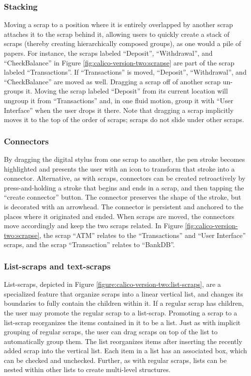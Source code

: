 \subsubsection{Stacking} Moving a scrap to a position where it is entirely overlapped by another scrap attaches it to the scrap behind it, allowing users to quickly create a stack of scraps (thereby creating hierarchically composed groups), as one would a pile of papers. For instance, the scraps labeled ``Deposit'', ``Withdrawal'', and ``CheckBalance'' in Figure \ref{fig:calico-version-two:scrapse} are part of the scrap labeled ``Transactions''. If ``Transactions'' is moved, ``Deposit'', ``Withdrawal'', and ``CheckBalance'' are moved as well. Dragging a scrap off of another scrap un-groups it. Moving the scrap labeled ``Deposit'' from its current location will ungroup it from ``Transactions'' and, in one fluid motion, group it with ``User Interface'' when the user drops it there. Note that dragging a scrap implicitly moves it to the top of the order of scraps; scraps do not slide under other scraps.

\subsubsection{Connectors} By dragging the digital stylus from one scrap to another, the pen stroke becomes highlighted and presents the user with an icon to transform that stroke into a connector. Alternative, as with scraps, connectors can be created retroactively by press-and-holding a stroke that begins and ends in a scrap, and then tapping the ``create connector'' button. The connector preserves the shape of the stroke, but is decorated with an arrowhead. The connector is persistent and anchored to the places where it originated and ended. When scraps are moved, the connectors move accordingly and keep the two scraps related. In Figure \ref{fig:calico-version-two:scrapse}, the scrap ``ATM'' relates to the ``Transactions'' and ``User Interface'' scraps, and the scrap ``Transaction'' relates to ``BankDB''.

\subsubsection{List-scraps and text-scraps} List-scraps, depicted in Figure \ref{figure:calico-version-two:list-scraps}, are a specialized feature that organize scraps into a linear vertical list, and changes its boundaries to fully contain the children within it. If a regular scrap has children, the user may promote the regular scrap to a list-scrap. Promoting a scrap to a list-scrap reorganizes the items contained in it to be a list. Just as with implicit grouping of regular scraps, the user can drag scraps on top of the list to automatically group them. The list reorganizes items after inserting the recently added scrap into the vertical list. Each item in a list has an associated box, which can be checked and unchecked. Further, as with regular scraps, lists can be nested within other lists to create multi-level structures.


